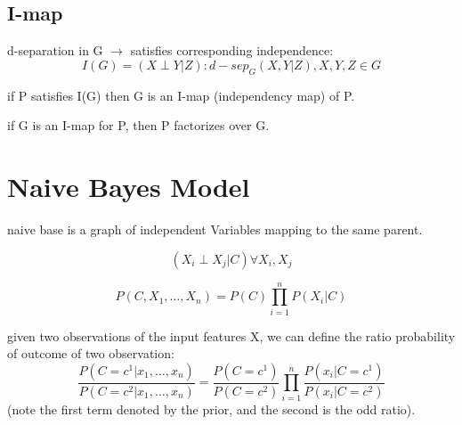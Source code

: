 \documentclass[4apaper,12pt]{book}
\begin{document}
\begin{description}
\begin{description}
\begin{description}
\begin{description}
          \subsection{I-map}
          \begin{description}
          \item d-separation in G $\rightarrow$ satisfies corresponding independence: $$ I(G) = {(X \perp Y | Z) : d-sep_G(X,Y|Z), X,Y,Z \in G} $$
          \item if P satisfies I(G) then G is an I-map (independency map) of P.
          \item if G is an I-map for P, then P factorizes over G.


          \end{description}
        \end{description}
      \end{description}
    \end{description}
  \end{description}
  \section{Naive Bayes Model}
  \begin{description}
  \item naive base is a graph of independent Variables mapping to the  same parent.
  \item {}

  \item $$(X_i \perp X_j | C) \forall X_i,X_j$$
  \item $$P(C,X_1,\dots,X_n) = P(C) \prod_{i=1}^{n}P(X_i|C) $$
  \item given two observations of the input features X, we can define the ratio probability of outcome of two observation: $$
    \frac{P(C=c^1 | x_1,\dots,x_n)}{P(C=c^2 | x_1,\dots,x_n)} = \frac{P(C=c^1)}{P(C=c^2)}\prod_{i=1}^n\frac{P(x_i|C=c^1)}{P(x_i|C=c^2)}$$ (note the first term denoted by the prior, and the second is the odd ratio).

  \end{description}
\end{document}
